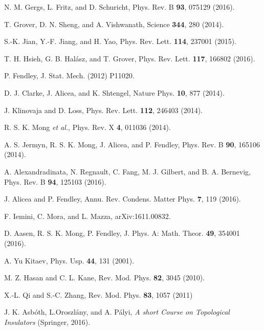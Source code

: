 \documentclass[aps, prb, showpacs, twocolumn, %
amssymb,superscriptaddress]{revtex4}
\begin{document}
\begin{thebibliography}{}
N. M. Gergs, L. Fritz, and D. Schuricht, Phys. Rev. B {\bf{93}}, 075129 (2016).

T. Grover, D. N. Sheng, and A. Vishwanath, Science {\bf 344},  280  (2014).

S.-K. Jian, Y.-F. Jiang, and H. Yao, Phys. Rev. Lett. {\bf 114}, 237001 (2015).

T. H. Hsieh, G. B. Hal\'asz, and T. Grover, Phys. Rev. Lett. {\bf 117}, 166802 (2016).

P. Fendley, J. Stat. Mech. (2012) P11020.

D. J. Clarke, J. Alicea, and K. Shtengel, Nature Phys. {\bf 10}, 877  (2014).

J. Klinovaja and D. Loss, Phys. Rev. Lett. {\bf 112}, 246403  (2014).

R. S. K. Mong {\it et al.}, Phys. Rev. X {\bf 4}, 011036 (2014).

A. S. Jermyn, R. S. K. Mong, J. Alicea, and P. Fendley, Phys. Rev. B {\bf 90}, 165106  (2014).

A. Alexandradinata, N. Regnault, C. Fang, M. J. Gilbert, and B. A. Bernevig, Phys. Rev. B {\bf 94}, 125103 (2016).

J. Alicea and P. Fendley, Annu. Rev. Condens. Matter Phys. {\bf 7}, 119 (2016).

F. Iemini, C. Mora, and L. Mazza, arXiv:1611.00832.

D. Aasen, R. S. K. Mong, P. Fendley, J. Phys. A: Math. Theor. {\bf 49}, 354001 (2016).

A. {Yu Kitaev}, Phys. Usp. {\bf 44}, 131 (2001).

M. Z. Hasan and C. L. Kane, Rev. Mod. Phys. {\bf 82}, 3045 (2010).

X.-L. Qi and S.-C. Zhang, Rev. Mod. Phys. {\bf 83}, 1057 (2011)

J. K. Asb\'oth, L.Oroszl\'any, and A. P\'alyi, \textit{A short Course on Topological Insulators} (Springer, 2016).


\end{thebibliography}
\end{document}
